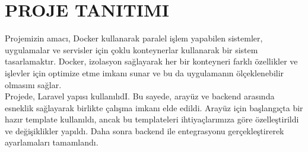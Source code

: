 \section{PROJE TANITIMI }
Projemizin amacı, Docker kullanarak paralel işlem yapabilen sistemler, uygulamalar ve servisler için çoklu konteynerlar kullanarak bir sistem tasarlamaktır. Docker, izolasyon sağlayarak her bir konteyneri farklı özellikler ve işlevler için optimize etme imkanı sunar ve bu da uygulamanın ölçeklenebilir olmasını sağlar.\\

Projede, Laravel yapısı kullanılıdI. Bu sayede, arayüz ve backend arasında esneklik sağlayarak birlikte çalışma imkanı elde edildi. Arayüz için başlangıçta bir hazır template kullanıldı, ancak bu templateleri ihtiyaçlarımıza göre özelleştirildi ve değişiklikler yapıldı. Daha sonra backend ile entegrasyonu gerçekleştirerek ayarlamaları tamamlandı.\\

